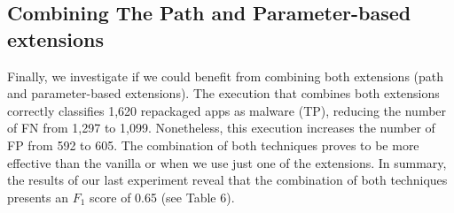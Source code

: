\begin{table}[ht]
  \caption{Accuracy of the \mas with aid of complementary techniques (3,211 app pairs).}
  \label{tab:accuracyParameter}
\end{table}

\subsection{Combining The Path and Parameter-based extensions} \label{sec:combination}

Finally, we investigate if we could benefit
from combining both extensions (path and parameter-based extensions).
The execution that combines both extensions correctly classifies 1,620 repackaged apps as malware (TP),
reducing the number of FN from 1,297 to 1,099. Nonetheless, this execution increases the number of FP from 592 to 605.
The combination of both techniques proves to be more effective than the vanilla \mas or when we use just one of the extensions.
In summary, the results of our last experiment reveal that the combination of both techniques presents an $F_1$ score of
0.65 (see Table 6).

